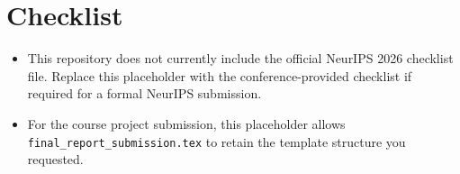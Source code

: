 \section*{Checklist}

\begin{itemize}
\item This repository does not currently include the official NeurIPS 2026 checklist file. Replace this placeholder with the conference-provided checklist if required for a formal NeurIPS submission.
\item For the course project submission, this placeholder allows \texttt{final\_report\_submission.tex} to retain the template structure you requested.
\end{itemize}
